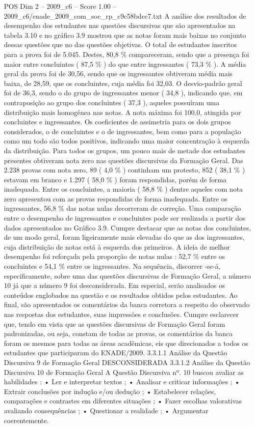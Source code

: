 \begin{textsample}{POS Dim 2 – 2009\_c6 – Score 1.00 – 2009\_c6/enade\_2009\_com\_soc\_rp\_c9c58bdcc7.txt}
A análise dos resultados de desempenho dos estudantes nas questões discursivas que são apresentados na tabela 3.10 e no gráfico 3.9 mostrou que as notas foram mais baixas no conjunto dessas questões que no das questões objetivas.
O total de estudantes inscritos para a prova foi de 5.045.
Destes, 80,8 \% compareceram, sendo que a presença foi maior entre concluintes ( 87,5 \% ) do que entre ingressantes ( 73,3 \% ).
A média geral da prova foi de 30,56, sendo que os ingressantes obtiveram média mais baixa, de 28,59, que os concluintes, cuja média foi 32,03.
O desvio-padrão geral foi de 36,3, sendo o do grupo de ingressantes menor ( 34,8 ), indicando que, em contraposição ao grupo dos concluintes ( 37,3 ), aqueles possuíram uma distribuição mais homogênea nas notas.
A nota máxima foi 100,0, atingida por concluintes e ingressantes.
Os coeficientes de assimetria para os dois grupos considerados, o de concluintes e o de ingressantes, bem como para a população como um todo são todos positivos, indicando uma maior concentração à esquerda da distribuição.
Para todos os grupos, um pouco mais de metade dos estudantes presentes obtiveram nota zero nas questões discursivas da Formação Geral.
Das 2.238 provas com nota zero, 89 ( 4,0 \% ) continham um protesto, 852 ( 38,1 \% ) estavam em branco e 1.297 ( 58,0 \% ) foram respondidas, porém de forma inadequada.
Entre os concluintes, a maioria ( 58,8 \% ) dentre aqueles com nota zero apresentou com as provas respondidas de forma inadequada.
Entre os ingressantes, 56,8 \% das notas nulas decorreram de correção.
Uma comparação entre o desempenho de ingressantes e concluintes pode ser realizada a partir dos dados apresentados no Gráfico 3.9.
Cumpre destacar que as notas dos concluintes, de um modo geral, foram ligeiramente mais elevadas do que as dos ingressantes, cuja distribuição de notas está à esquerda dos primeiros.
A ideia de melhor desempenho foi reforçada pela proporção de notas nulas : 52,7 \% entre os concluintes e 54,1 \% entre os ingressantes.
Na sequência, discorrer -se-á, especificamente, sobre uma das questões discursivas de Formação Geral, a número 10 já que a número 9 foi desconsiderada.
Em especial, serão analisados os conteúdos englobados na questão e os resultados obtidos pelos estudantes.
Ao final, são apresentados os comentários da banca corretora a respeito do observado nas respostas dos estudantes, suas impressões e conclusões.
Cumpre esclarecer que, tendo em vista que as questões discursivas de Formação Geral foram padronizadas, ou seja, constam de todas as provas, os comentários da banca foram os mesmos para todas as áreas acadêmicas, eis que direcionados a todos os estudantes que participaram do ENADE/2009. 3.3.1.1 Análise da Questão Discursiva 9 de Formação Geral DESCONSIDERADA 3.3.1.2 Análise da Questão Discursiva 10 de Formação Geral A Questão Discursiva nº. 10 buscou avaliar as habilidades : • Ler e interpretar textos ; • Analisar e criticar informações ; • Extrair conclusões por indução e/ou dedução ; • Estabelecer relações, comparações e contrastes em diferentes situações ; • Fazer escolhas valorativas avaliando consequências ; • Questionar a realidade ; • Argumentar coerentemente.

\end{textsample}
